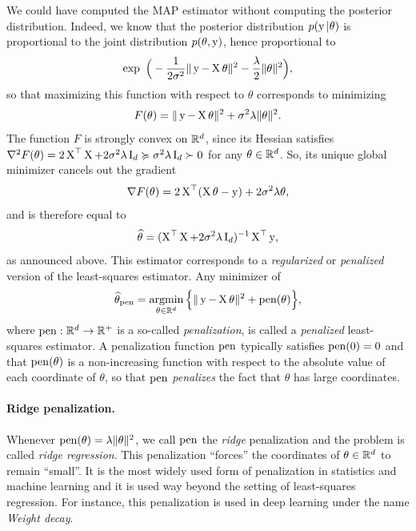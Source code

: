 We could have computed the MAP estimator without computing the posterior distribution.
Indeed, we know that the posterior distribution $p(\operatorname{{\boldsymbol y}} | \theta)$ is proportional to the joint distribution $p(\theta, \operatorname{{\boldsymbol y}})$, hence proportional to
\begin{equation*}
	\exp \Big( -\frac{1}{2 \sigma^2} \norm{\by - \bX \theta}^2 - \frac{\lambda}{2} \norm{\theta}^2 \Big),
\end{equation*}
so that maximizing this function with respect to $\theta$ corresponds to minimizing
\begin{equation*}
	F(\theta) = \| \operatorname{{\boldsymbol y}} - \operatorname{{\boldsymbol X}} \theta \|^2 + \sigma^2 \lambda \| \theta \|^2.
\end{equation*}
The function $F$ is strongly convex on $\mathbb R^d$, since its Hessian satisfies 
$\nabla^2 F(\theta) = 2 \operatorname{{\boldsymbol X}}^\top \operatorname{{\boldsymbol X}} + 2\sigma^2 \lambda \operatorname{{\boldsymbol I}}_d \succcurlyeq \sigma^2 \lambda \operatorname{{\boldsymbol I}}_d \succ 0$ for any $\theta \in \mathbb R^d$.
So, its unique global minimizer cancels out the gradient
\begin{equation*}
	\nabla F(\theta) = 2 \operatorname{{\boldsymbol X}}^\top (\operatorname{{\boldsymbol X}} \theta - \operatorname{{\boldsymbol y}}) + 2 \sigma^2 \lambda \theta,
\end{equation*}
and is therefore equal to
\begin{equation*}
	\widehat \theta = (\operatorname{{\boldsymbol X}}^\top \operatorname{{\boldsymbol X}} + 2 \sigma^2 \lambda \operatorname{{\boldsymbol I}}_d)^{-1} \operatorname{{\boldsymbol X}}^\top \operatorname{{\boldsymbol y}},
\end{equation*}
as announced above.
This estimator corresponds to a \emph{regularized} or \emph{penalized} version of the least-squares estimator.
Any minimizer of
\begin{equation*}
	\widehat \theta_{\operatorname{pen}} = \operatorname*{argmin}_{\theta \in \mathbb R^d} \Big\{ \| \operatorname{{\boldsymbol y}} - \operatorname{{\boldsymbol X}} \theta \|^2 + \operatorname{pen}(\theta) \Big\},
\end{equation*}
where $\operatorname{pen} : \mathbb R^d \rightarrow \mathbb R^+$ is a so-called \emph{penalization}, is called a \emph{penalized} least-squares estimator.
A penalization function $\operatorname{pen}$ typically satisfies $\operatorname{pen}(0) = 0$ and that $\operatorname{pen}(\theta)$ is a non-increasing function with respect to the absolute value of each coordinate of $\theta$, so that $\operatorname{pen}$ \emph{penalizes} the fact that $\theta$ has large coordinates.


\paragraph{Ridge penalization.}

Whenever $\operatorname{pen}(\theta) = \lambda \| \theta \|^2$, we call $\operatorname{pen}$ the \emph{ridge} penalization and the problem is called \emph{ridge regression}. 
This penalization ``forces'' the coordinates of $\theta \in \mathbb R^d$ to remain ``small''.
It is the most widely used form of penalization in statistics and machine learning and it is used way beyond the setting of least-squares regression. 
For instance, this penalization is used in deep learning under the name \emph{Weight decay}.


